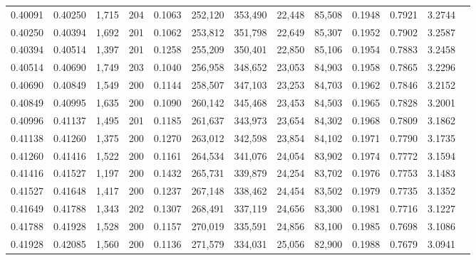 \begin{tabular}{rrrrrrrrrrrrr}
0.40091 & 0.40250 & 1,715 & 204 &                                     0.1063 & 252,120 & 353,490 &  22,448 &  85,508 & 0.1948 & 0.7921 & 3.2744 \\
0.40250 & 0.40394 & 1,692 & 201 &                                     0.1062 & 253,812 & 351,798 &  22,649 &  85,307 & 0.1952 & 0.7902 & 3.2587 \\
0.40394 & 0.40514 & 1,397 & 201 &                                     0.1258 & 255,209 & 350,401 &  22,850 &  85,106 & 0.1954 & 0.7883 & 3.2458 \\
0.40514 & 0.40690 & 1,749 & 203 &                                     0.1040 & 256,958 & 348,652 &  23,053 &  84,903 & 0.1958 & 0.7865 & 3.2296 \\
0.40690 & 0.40849 & 1,549 & 200 &                                     0.1144 & 258,507 & 347,103 &  23,253 &  84,703 & 0.1962 & 0.7846 & 3.2152 \\
0.40849 & 0.40995 & 1,635 & 200 &                                     0.1090 & 260,142 & 345,468 &  23,453 &  84,503 & 0.1965 & 0.7828 & 3.2001 \\
0.40996 & 0.41137 & 1,495 & 201 &                                     0.1185 & 261,637 & 343,973 &  23,654 &  84,302 & 0.1968 & 0.7809 & 3.1862 \\
0.41138 & 0.41260 & 1,375 & 200 &                                     0.1270 & 263,012 & 342,598 &  23,854 &  84,102 & 0.1971 & 0.7790 & 3.1735 \\
0.41260 & 0.41416 & 1,522 & 200 &                                     0.1161 & 264,534 & 341,076 &  24,054 &  83,902 & 0.1974 & 0.7772 & 3.1594 \\
0.41416 & 0.41527 & 1,197 & 200 &                                     0.1432 & 265,731 & 339,879 &  24,254 &  83,702 & 0.1976 & 0.7753 & 3.1483 \\
0.41527 & 0.41648 & 1,417 & 200 &                                     0.1237 & 267,148 & 338,462 &  24,454 &  83,502 & 0.1979 & 0.7735 & 3.1352 \\
0.41649 & 0.41788 & 1,343 & 202 &                                     0.1307 & 268,491 & 337,119 &  24,656 &  83,300 & 0.1981 & 0.7716 & 3.1227 \\
0.41788 & 0.41928 & 1,528 & 200 &                                     0.1157 & 270,019 & 335,591 &  24,856 &  83,100 & 0.1985 & 0.7698 & 3.1086 \\
0.41928 & 0.42085 & 1,560 & 200 &                                     0.1136 & 271,579 & 334,031 &  25,056 &  82,900 & 0.1988 & 0.7679 & 3.0941 \\

\end{tabular}
